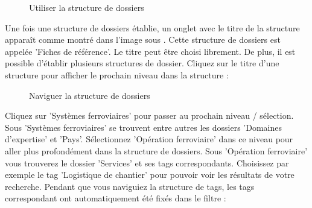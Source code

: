 \begin{figure}[H]
\caption{Utiliser la structure de dossiers}
\end{figure}

Une fois une structure de dossiers établie, un onglet avec le titre de la structure apparaît comme montré dans l'image sous . Cette structure de dossiers est appelée 'Fiches de référence'. Le titre peut être choisi librement. De plus, il est possible d'établir plusieurs structures de dossier. Cliquez sur le titre d'une structure pour afficher le prochain niveau dans la structure  :

\begin{figure}[H]
\caption{Naviguer la structure de dossiers}
\end{figure}

Cliquez sur 'Systèmes ferroviaires'  pour passer au prochain niveau / sélection. Sous 'Systèmes ferroviaires' se trouvent entre autres les dossiers 'Domaines d'expertise' et 'Pays'. Sélectionnez 'Opération ferroviaire'  dans ce niveau pour aller plus profondément dans la structure de dossiers. Sous 'Opération ferroviaire' vous trouverez le dossier 'Services' et ses tags correspondants. Choisissez par exemple le tag 'Logistique de chantier'  pour pouvoir voir les résultats de votre recherche. Pendant que vous naviguiez la structure de tags, les tags correspondant ont automatiquement été fixés dans le filtre :

